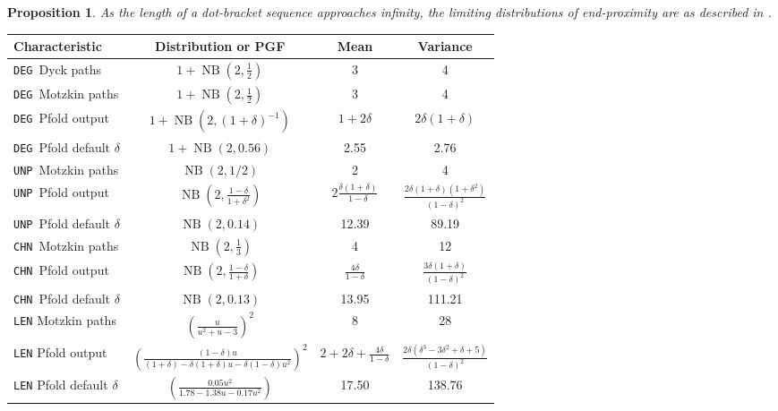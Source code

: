 \documentclass{article}
\DeclareMathOperator{\NB}{NB}
\newtheorem{proposition}[theorem]{Proposition}
\newcommand{\DEG}{{\tt DEG}}
\newcommand{\UNP}{{\tt UNP}}
\newcommand{\COV}{{\tt CHN}}
\begin{document}
\begin{proposition}
    As the length of a dot-bracket sequence approaches infinity, the limiting distributions of end-proximity are as described in .
\end{proposition}


\begin{table}[h]
\centering
\renewcommand{\arraystretch}{1.3}
\setlength{\tabcolsep}{8pt}
\begin{tabular}{|l|c|c|c|}
\hline
\textbf{Characteristic} & \textbf{Distribution or PGF} & \textbf{Mean} & \textbf{Variance} \\
\hline
\DEG\ Dyck paths & \( 1 + \NB(2, \tfrac{1}{2}) \) & 3 & 4 \\
\hline
\DEG\ Motzkin paths & \( 1 + \NB(2, \tfrac{1}{2}) \) & 3 & 4 \\
\hline
\DEG\ Pfold output & \( 1 + \NB(2, (1 + \delta)^{-1}) \) & \( 1 + 2\delta \) & \( 2\delta(1 + \delta) \) \\
\hline
\DEG\ Pfold default $\delta$ & \( 1 + \NB(2, 0.56) \) & 2.55 & 2.76 \\
\hline\hline
\UNP\ Motzkin paths & $\NB(2, 1/2)$ & 2 & 4\\
\hline
\UNP\ Pfold output & $\NB(2, \tfrac{1 - \delta}{1 + \delta^2})$ & $2\tfrac{\delta(1 + \delta)}{1 - \delta}$ & $\tfrac{2\delta(1+\delta)(1+\delta^2)}{(1-\delta)^2}$\\
\hline
\UNP\ Pfold default $\delta$ & $\NB(2, 0.14)$ & 12.39 & 89.19\\
\hline\hline
\COV\ Motzkin paths & $ \NB(2, \tfrac{1}{3}) $ & 4 & 12 \\
\hline
\COV\ Pfold output & \( \NB\!\left(2, \tfrac{1-\delta}{1 + \delta}\right) \) & \( \tfrac{4\delta}{1 - \delta} \) & \( \tfrac{3\delta(1 + \delta)}{(1 - \delta)^2} \) \\
\hline
\COV\ Pfold default $\delta$ & \( \NB\!\left(2, 0.13\right) \) & 13.95 & 111.21 \\
\hline\hline
\texttt{LEN} Motzkin paths & \rule{0pt}{3.2ex}\( \left( \tfrac{u}{u^2 + u - 3}\right)^2 \) & 8 & 28 \\
\hline
\texttt{LEN} Pfold output & \rule{0pt}{3.2ex}\( \left( \tfrac{(1-\delta)u}{(1 + \delta) - \delta(1 + \delta)u - \delta(1-\delta)u^2}\right)^2 \) & \( 2 + 2\delta + \tfrac{4\delta}{1-\delta} \) & \( \tfrac{2\delta(\delta^3 - 3\delta^2 + \delta + 5)}{(1-\delta)^2} \) \\
\hline
\texttt{LEN} Pfold default $\delta$ & \rule{0pt}{3.2ex}\( \left( \tfrac{0.05u^2}{1.78 - 1.38u - 0.17u^2}\right) \) & 17.50 & 138.76 \\

\end{tabular}
\end{table}
\end{document}

